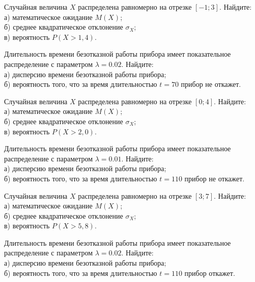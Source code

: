 \vfill

\newpage\setcounter{zad}{0}

\z Случайная величина $X$ распределена равномерно на отрезке $[-1; 3]$. Найдите: \\ \quad а) математическое ожидание $M(X)$; \\ \quad б) среднее квадратическое отклонение $\sigma_X$; \\ \quad в) вероятность $P(X>1{,}4)$.


\vfill

\z Длительность времени безотказной работы прибора имеет показательное распределение с параметром $\lambda = 0.02$. Найдите: \\ \quad а) дисперсию времени безотказной работы прибора; \\ \quad б) вероятность того, что за время длительностью $t = 70$ прибор не откажет.
 

\vfill

\newpage\setcounter{zad}{0}

\z Случайная величина $X$ распределена равномерно на отрезке $[0; 4]$. Найдите: \\ \quad а) математическое ожидание $M(X)$; \\ \quad б) среднее квадратическое отклонение $\sigma_X$; \\ \quad в) вероятность $P(X>2{,}0)$.


\vfill

\z Длительность времени безотказной работы прибора имеет показательное распределение с параметром $\lambda = 0.01$. Найдите: \\ \quad а) дисперсию времени безотказной работы прибора; \\ \quad б) вероятность того, что за время длительностью $t = 110$ прибор не откажет.
 

\vfill

\newpage\setcounter{zad}{0}

\z Случайная величина $X$ распределена равномерно на отрезке $[3; 7]$. Найдите: \\ \quad а) математическое ожидание $M(X)$; \\ \quad б) среднее квадратическое отклонение $\sigma_X$; \\ \quad в) вероятность $P(X>5{,}8)$.


\vfill

\z Длительность времени безотказной работы прибора имеет показательное распределение с параметром $\lambda = 0.02$. Найдите: \\ \quad а) дисперсию времени безотказной работы прибора; \\ \quad б) вероятность того, что за время длительностью $t = 110$ прибор откажет.
 

